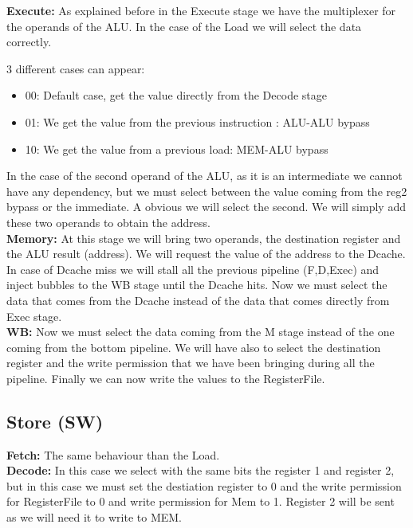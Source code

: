 \documentclass{article}
\begin{document}
\textbf{Execute:}
As explained before in the Execute stage we have the multiplexer for the operands of the ALU. In the case of the Load we will select the data correctly.

3 different cases can appear:
\begin{itemize}
\item 00: Default case, get the value directly from the Decode stage
\item 01: We get the value from the previous instruction : ALU-ALU bypass
\item 10: We get the value from a previous load: MEM-ALU bypass
\end{itemize}

In the case of the second operand of the ALU, as it is an intermediate we cannot have any dependency, but we must select between the value coming from the reg2 bypass or the immediate. A obvious we will select the second.
We will simply add these two operands to obtain the address.\\

\textbf{Memory:}
At this stage we will bring two operands, the destination register and the ALU result (address). We will request the value of the address to the Dcache. In case of Dcache miss we will stall all the previous pipeline (F,D,Exec) and inject bubbles to the WB stage until the Dcache hits. Now we must select the data that comes from the Dcache instead of the data that comes directly from Exec stage.\\

\textbf{WB:}
Now we must select the data coming from the M stage instead of the one coming from the bottom pipeline. We will have also to select the destination register and the write permission that we have been bringing during all the pipeline. Finally we can now write the values to the RegisterFile.\\

\newpage
\subsection{Store (SW)}
\textbf{Fetch:}
The same behaviour than the Load.\\

\textbf{Decode:}
In this case we select with the same bits the register 1 and register 2, but in this case we must set the destiation register to 0 and the write permission for RegisterFile to 0 and write permission for Mem to 1. Register 2 will be sent as we will need it to write to MEM.\\
\end{document}
